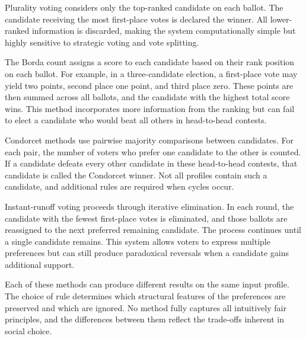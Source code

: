 Plurality voting considers only the top-ranked candidate on each ballot. The candidate receiving the most first-place votes is declared the winner. All lower-ranked information is discarded, making the system computationally simple but highly sensitive to strategic voting and vote splitting.

The Borda count assigns a score to each candidate based on their rank position on each ballot. For example, in a three-candidate election, a first-place vote may yield two points, second place one point, and third place zero. These points are then summed across all ballots, and the candidate with the highest total score wins. This method incorporates more information from the ranking but can fail to elect a candidate who would beat all others in head-to-head contests.

Condorcet methods use pairwise majority comparisons between candidates. For each pair, the number of voters who prefer one candidate to the other is counted. If a candidate defeats every other candidate in these head-to-head contests, that candidate is called the Condorcet winner. Not all profiles contain such a candidate, and additional rules are required when cycles occur.

Instant-runoff voting proceeds through iterative elimination. In each round, the candidate with the fewest first-place votes is eliminated, and those ballots are reassigned to the next preferred remaining candidate. The process continues until a single candidate remains. This system allows voters to express multiple preferences but can still produce paradoxical reversals when a candidate gains additional support.

Each of these methods can produce different results on the same input profile. The choice of rule determines which structural features of the preferences are preserved and which are ignored. No method fully captures all intuitively fair principles, and the differences between them reflect the trade-offs inherent in social choice.

